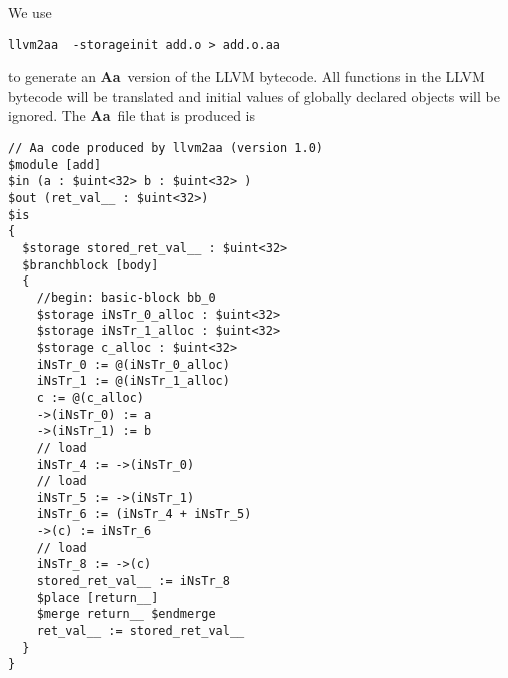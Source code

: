 \documentclass{article}
\newcommand{\Aa}{{\bf Aa}~}
\begin{document}
We use 
\begin{verbatim}
llvm2aa  -storageinit add.o > add.o.aa 
\end{verbatim}
to generate an \Aa version of the LLVM bytecode.
All functions in the LLVM bytecode will be translated
and initial values of globally declared objects will
be ignored.
The \Aa file that is produced is
\begin{verbatim}
// Aa code produced by llvm2aa (version 1.0)
$module [add] 
$in (a : $uint<32> b : $uint<32> )
$out (ret_val__ : $uint<32>)
$is 
{
  $storage stored_ret_val__ : $uint<32>
  $branchblock [body] 
  {
    //begin: basic-block bb_0
    $storage iNsTr_0_alloc : $uint<32>
    $storage iNsTr_1_alloc : $uint<32>
    $storage c_alloc : $uint<32>
    iNsTr_0 := @(iNsTr_0_alloc)
    iNsTr_1 := @(iNsTr_1_alloc)
    c := @(c_alloc)
    ->(iNsTr_0) := a
    ->(iNsTr_1) := b
    // load 
    iNsTr_4 := ->(iNsTr_0) 
    // load 
    iNsTr_5 := ->(iNsTr_1) 
    iNsTr_6 := (iNsTr_4 + iNsTr_5)
    ->(c) := iNsTr_6
    // load 
    iNsTr_8 := ->(c) 
    stored_ret_val__ := iNsTr_8
    $place [return__]
    $merge return__ $endmerge
    ret_val__ := stored_ret_val__ 
  }
}
\end{verbatim}
\end{document}
